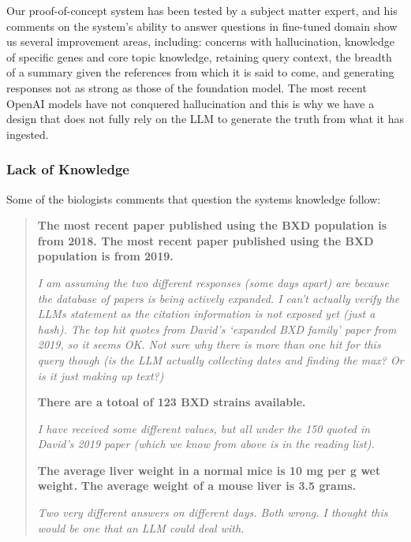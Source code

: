 Our proof-of-concept system has been tested by a subject matter expert, and his comments on the system's ability to answer questions in fine-tuned domain show us several improvement areas, including: concerns with hallucination, knowledge of specific genes and core topic knowledge, retaining query context, the breadth of a summary given the references from which it is said to come, and generating responses not as strong as those of the foundation model.
The most recent OpenAI models have not conquered hallucination \cite{OpenAI:2023:gpt4} and this is why we have a design that does not fully rely on the LLM to generate the truth from what it has ingested.

\subsubsection{Lack of Knowledge}
Some of the biologists comments that question the systems knowledge follow: 
\begin{quotation}

\textbf{The most recent paper published using the BXD population is from 2018. The most recent paper published using the BXD population is from 2019.} 

\textit{I am assuming the two different responses (some days apart) are because the database of papers is being actively expanded. I can’t actually verify the LLMs statement as the citation information is not exposed yet (just a hash). The top hit quotes from David’s ‘expanded BXD family’ paper from 2019, so it seems OK. Not sure why there is more than one hit for this query though (is the LLM actually collecting dates and finding the max? Or is it just making up text?)}


\textbf{There are a totoal of 123 BXD strains available.} 

\textit{I have received some different values, but all under the 150 quoted in David's 2019 paper (which we know from above is in the reading list).}


\textbf{The average liver weight in a normal mice is 10 mg per g wet weight.}  
\textbf{The average weight of a mouse liver is 3.5 grams.}
 
\textit{Two very different answers on different days. Both wrong. I thought this would be one that an LLM could deal with.}
\end{quotation}

